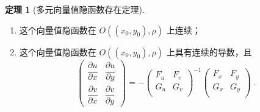 \documentclass[zihao=-4,linespread=1.8,UTF8,nothm]{aytony_base}
\theoremstyle{definition}
\newtheorem{theorem}{\indent\heiti\textbf{定理}}[subsection]
\begin{document}
\begin{theorem}[多元向量值隐函数存在定理]
\begin{enumerate}[nosep]
        \item 这个向量值隐函数在 $O((x_0, y_0), \rho)$ 上连续；
        \item 这个向量值隐函数在 $O((x_0, y_0), \rho)$ 上具有连续的导数，且 $$
                  \left(
                  \begin{matrix}
                          \dfrac{\partial u}{\partial x} & \dfrac{\partial u}{\partial y} \\
                          \dfrac{\partial v}{\partial x} & \dfrac{\partial v}{\partial y}
                      \end{matrix}
                  \right) = - \left(
                  \begin{matrix}
                      F_u & F_v \\
                      G_u & G_v \\
                  \end{matrix}
                  \right)^{-1}\left(
                  \begin{matrix}
                          F_x & F_y \\
                          G_x & G_y \\
                      \end{matrix}
                  \right)\ .
              $$
    \end{enumerate}
\end{theorem}
\end{document}
